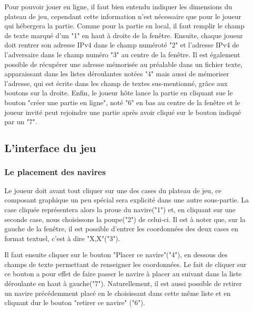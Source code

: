 		Pour pouvoir jouer en ligne, il faut bien entendu indiquer les dimensions du plateau de jeu, cependant cette information n'est nécessaire que pour le joueur qui hébergera la partie. Comme pour la partie en local, il faut remplir le champ de texte marqué d'un "1" en haut à droite de la fenêtre. Ensuite, chaque joueur doit rentrer son adresse IPv4 dans le champ numéroté "2" et l'adresse IPv4 de l'adversaire dans le champ numéro "3" au centre de la fenêtre. \newline
Il est également possible de récupérer une adresse mémorisée au préalable dans un fichier texte, apparaissant dans les listes déroulantes notées "4" mais aussi de mémoriser l'adresse, qui est écrite dans les champ de textes sus-mentionné, grâce aux boutons sur la droite.
\newline
Enfin, le joueur hôte lance la partie en cliquant sue le bouton "créer une partie en ligne", noté "6" en bas au centre de la fenêtre et le joueur invité peut rejoindre une partie après avoir cliqué sur le bouton indiqué par un "7".

\subsection{L'interface du jeu}
	\subsubsection{Le placement des navires}

	Le  joueur doit avant tout cliquer sur une des cases du plateau de jeu, ce composant graphique un peu spécial sera explicité dans une autre sous-partie. La case cliquée représentera alors la proue du navire("1") et, en cliquant sur une seconde case, nous choisissons la poupe("2") de celui-ci. Il est à noter que, sur la gauche de la fenêtre, il est possible d'entrer les coordonnées des deux cases en format textuel, c'est à dire "X,X"("3").
	\newline
	
	Il faut ensuite cliquer sur le bouton "Placer ce navire"("4"), en dessous des champs de texte permettant de renseigner les coordonnées. Le fait de cliquer sur ce bouton a pour effet de faire passer le navire à placer au suivant dans la liste déroulante en haut à gauche("7"). Naturellement, il est aussi possible de retirer un navire précédemment placé en le choisissant dans cette même liste et en cliquant dur le bouton "retirer ce navire" ("6").
	\newline
	
